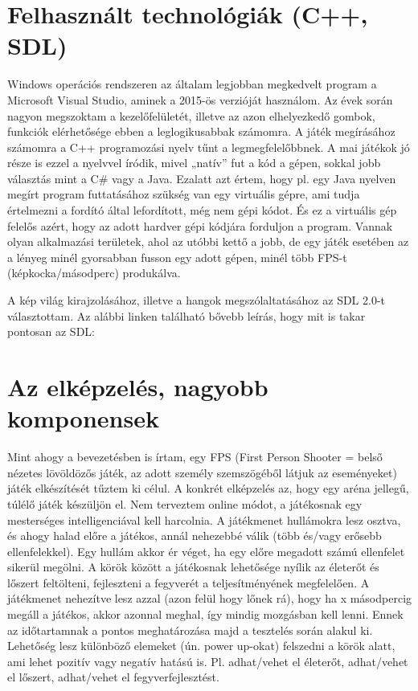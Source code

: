 \label{Chap:komponensek}

\section{Felhasznált technológiák (C++, SDL)}

Windows operációs rendszeren az általam legjobban megkedvelt program a Microsoft Visual Studio, aminek a 2015-ös verzióját használom. Az évek során nagyon megszoktam a kezelőfelületét, illetve az azon elhelyezkedő gombok, funkciók elérhetősége ebben a leglogikusabbak számomra. A játék megírásához számomra a C++ programozási nyelv tűnt a legmegfelelőbbnek. A mai játékok jó része is ezzel a nyelvvel íródik, mivel „natív” fut a kód a gépen, sokkal jobb választás mint a C\# vagy a Java. Ezalatt azt értem, hogy pl. egy Java nyelven megírt program futtatásához szükség van egy virtuális gépre, ami tudja értelmezni a fordító által lefordított, még nem gépi kódot. És ez a virtuális gép felelős azért, hogy az adott hardver gépi kódjára forduljon a program. Vannak olyan alkalmazási területek, ahol az utóbbi kettő a jobb, de egy játék esetében az a lényeg minél gyorsabban fusson egy adott gépen, minél több FPS-t (képkocka/másodperc) produkálva.

A kép világ kirajzolásához, illetve a hangok megszólaltatásához az SDL 2.0-t választottam. Az alábbi linken található bővebb leírás, hogy mit is takar pontosan az SDL:


\section{Az elképzelés, nagyobb komponensek}

Mint ahogy a bevezetésben is írtam, egy FPS (First Person Shooter = belső nézetes lövöldözős játék, az adott személy szemszögéből látjuk az eseményeket) játék elkészítését tűztem ki célul. A konkrét elképzelés az, hogy egy aréna jellegű, túlélő játék készüljön el. Nem terveztem online módot, a játékosnak egy mesterséges intelligenciával kell harcolnia. A játékmenet hullámokra lesz osztva, és ahogy halad előre a játékos, annál nehezebbé válik (több és/vagy erősebb ellenfelekkel). Egy hullám akkor ér véget, ha egy előre megadott számú ellenfelet sikerül megölni. A körök között a játékosnak lehetősége nyílik az életerőt és lőszert feltölteni, fejleszteni a fegyverét a teljesítményének megfelelően. A játékmenet nehezítve lesz azzal (azon felül hogy lőnek rá), hogy ha x másodpercig megáll a játékos, akkor azonnal meghal, így mindig mozgásban kell lenni. Ennek az időtartamnak a pontos meghatározása majd a tesztelés során alakul ki. Lehetőség lesz különböző elemeket (ún. power up-okat) felszedni a körök alatt, ami lehet pozitív vagy negatív hatású is. Pl. adhat/vehet el életerőt, adhat/vehet el lőszert, adhat/vehet el fegyverfejlesztést.

